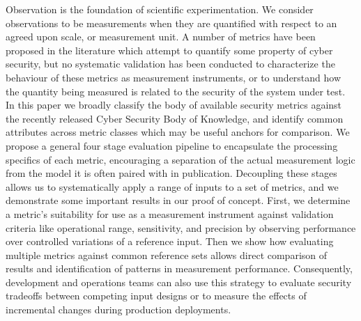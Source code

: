 
Observation is the foundation of scientific experimentation. We consider observations to be measurements when they are quantified with respect to an agreed upon scale, or measurement unit. A number of metrics have been proposed in the literature which attempt to quantify some property of cyber security, but no systematic validation has been conducted to characterize the behaviour of these metrics as measurement instruments, or to understand how the quantity being measured is related to the security of the system under test. In this paper we broadly classify the body of available security metrics against the recently released Cyber Security Body of Knowledge, and identify common attributes across metric classes which may be useful anchors for comparison. We propose a general four stage evaluation pipeline to encapsulate the processing specifics of each metric, encouraging a separation of the actual measurement logic from the model it is often paired with in publication. Decoupling these stages allows us to systematically apply a range of inputs to a set of metrics, and we demonstrate some important results in our proof of concept. First, we determine a metric's suitability for use as a measurement instrument against validation criteria like operational range, sensitivity, and precision by observing performance over controlled variations of a reference input. Then we show how evaluating multiple metrics against common reference sets allows direct comparison of results and identification of patterns in measurement performance. Consequently, development and operations teams can also use this strategy to evaluate security tradeoffs between competing input designs or to measure the effects of incremental changes during production deployments. 




